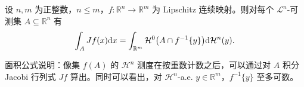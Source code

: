 \documentclass[../../main.tex]{subfiles}%
\begin{document}
\begin{theorem}[面积公式]\label{theorem:ch03-3-8}
设 $n,m$ 为正整数，$n\leqslant m$，$f:\mathbb{R}^n\to\mathbb{R}^m$ 为 Lipschitz 连续映射。则对每个 $\mathcal{L}^n$-可测集 $A\subseteq\mathbb{R}^n$ 有
\begin{align*}
\int_AJf(x)\mathrm{d} x=\int_{\mathbb{R}^m}\mathcal{H}^0\bigl(A\cap f^{-1}\{y\}\bigr)\mathrm{d}\mathcal{H}^n(y).
\end{align*}
\end{theorem}

\begin{remark}\label{remark:ch03-thm-3-8-解释}
面积公式说明：像集 $f(A)$ 的 $\mathcal{H}^n$ 测度在按重数计数之后，可以通过对 $A$ 积分 Jacobi 行列式 $Jf$ 算出。同时可以看出，对 $\mathcal{H}^n$-a.e. $y\in\mathbb{R}^m$，$f^{-1}\{y\}$ 至多可数。
\end{remark}
\end{document}
